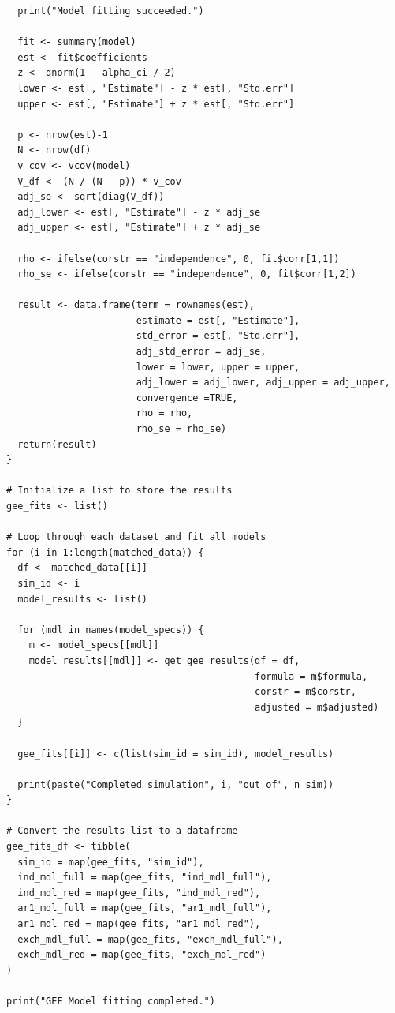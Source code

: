 \documentclass[
]{aft}
\begin{document}
\begin{verbatim}
  print("Model fitting succeeded.")
  
  fit <- summary(model)
  est <- fit$coefficients
  z <- qnorm(1 - alpha_ci / 2)
  lower <- est[, "Estimate"] - z * est[, "Std.err"]
  upper <- est[, "Estimate"] + z * est[, "Std.err"]
  
  p <- nrow(est)-1
  N <- nrow(df)
  v_cov <- vcov(model)
  V_df <- (N / (N - p)) * v_cov
  adj_se <- sqrt(diag(V_df))
  adj_lower <- est[, "Estimate"] - z * adj_se
  adj_upper <- est[, "Estimate"] + z * adj_se
  
  rho <- ifelse(corstr == "independence", 0, fit$corr[1,1])
  rho_se <- ifelse(corstr == "independence", 0, fit$corr[1,2])
  
  result <- data.frame(term = rownames(est), 
                       estimate = est[, "Estimate"], 
                       std_error = est[, "Std.err"], 
                       adj_std_error = adj_se,
                       lower = lower, upper = upper, 
                       adj_lower = adj_lower, adj_upper = adj_upper,
                       convergence =TRUE, 
                       rho = rho, 
                       rho_se = rho_se) 
  return(result)
}

# Initialize a list to store the results
gee_fits <- list()

# Loop through each dataset and fit all models
for (i in 1:length(matched_data)) {
  df <- matched_data[[i]]
  sim_id <- i
  model_results <- list()
  
  for (mdl in names(model_specs)) {
    m <- model_specs[[mdl]]
    model_results[[mdl]] <- get_gee_results(df = df, 
                                            formula = m$formula, 
                                            corstr = m$corstr, 
                                            adjusted = m$adjusted)
  }
  
  gee_fits[[i]] <- c(list(sim_id = sim_id), model_results)
  
  print(paste("Completed simulation", i, "out of", n_sim))
}

# Convert the results list to a dataframe
gee_fits_df <- tibble(
  sim_id = map(gee_fits, "sim_id"),
  ind_mdl_full = map(gee_fits, "ind_mdl_full"),
  ind_mdl_red = map(gee_fits, "ind_mdl_red"), 
  ar1_mdl_full = map(gee_fits, "ar1_mdl_full"), 
  ar1_mdl_red = map(gee_fits, "ar1_mdl_red"), 
  exch_mdl_full = map(gee_fits, "exch_mdl_full"), 
  exch_mdl_red = map(gee_fits, "exch_mdl_red")
)

print("GEE Model fitting completed.")


\end{verbatim}
\end{document}
